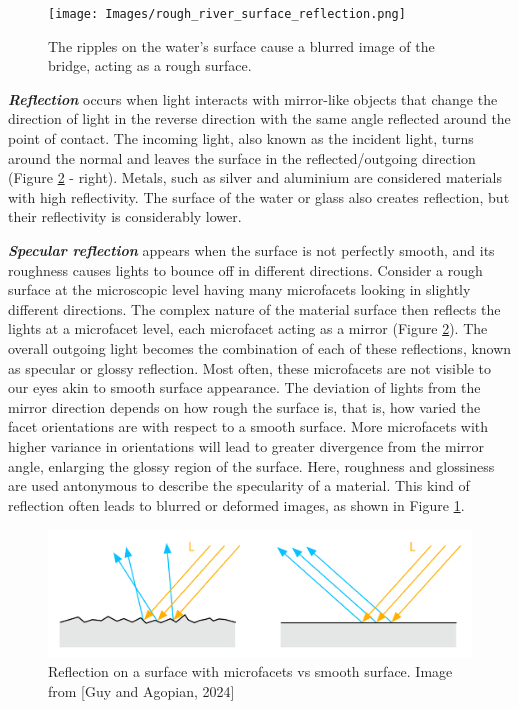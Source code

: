 \begin{figure}
\texttt{[image: Images/rough\_river\_surface\_reflection.png]}
\caption{The ripples on the water's surface cause a blurred image of the bridge, acting as a rough surface.}\label{fig:water_reflection}
\end{figure}  

\textbf{\textit{Reflection}} occurs when light interacts with mirror-like objects that change the direction of light in the reverse direction with the same angle reflected around the point of contact. The incoming light, also known as the incident light, turns around the normal and leaves the surface in the reflected/outgoing direction (Figure \ref{fig:microfacet} - right). Metals, such as silver and aluminium are considered materials with high reflectivity. The surface of the water or glass also creates reflection, but their reflectivity is considerably lower.

\textbf{\textit{Specular reflection}} appears when the surface is not perfectly smooth, and its roughness causes lights to bounce off in different directions. Consider a rough surface at the microscopic level having many microfacets looking in slightly different directions. The complex nature of the material surface then reflects the lights at a microfacet level, each microfacet acting as a mirror (Figure \ref{fig:microfacet}). The overall outgoing light becomes the combination of each of these reflections, known as specular or glossy reflection. Most often, these microfacets are not visible to our eyes akin to smooth surface appearance. The deviation of lights from the mirror direction depends on how rough the surface is, that is, how varied the facet orientations are with respect to a smooth surface. More microfacets with higher variance in orientations will lead to greater divergence from the mirror angle, enlarging the glossy region of the surface. Here, roughness and glossiness are used antonymous to describe the specularity of a material. This kind of reflection often leads to blurred or deformed images, as shown in Figure \ref{fig:water_reflection}. 



\begin{figure}
\includegraphics[width=\linewidth]{Images/diagram_microfacet.png}
\caption{Reflection on a surface with microfacets vs smooth surface. Image from [Guy and Agopian, 2024]}\label{fig:microfacet}
\end{figure} 

